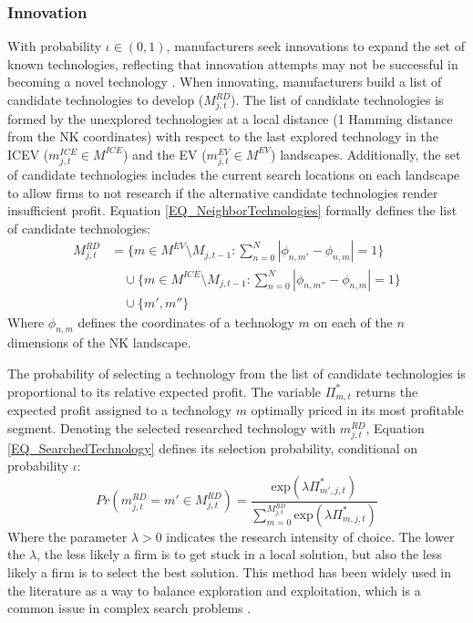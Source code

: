 \documentclass[12pt]{article}
\begin{document}
	\subsubsection{Innovation} \label{Supply:Innovation}
	With probability $\iota\in(0,1)$, manufacturers seek innovations to expand the set of known technologies, reflecting that innovation attempts may not be successful in becoming a novel technology \citep{nelson1977search, Dosi2010}. When innovating, manufacturers build a list of candidate technologies to develop ($M^{RD}_{j,t}$). The list of candidate technologies is formed by the unexplored technologies at a local distance (1 Hamming distance from the NK coordinates) with respect to the last explored technology in the ICEV ($m^{ICE}_{j,t}\in{M^{ICE}}$) and the EV ($m^{EV}_{j,t}\in{M^{EV}}$) landscapes. Additionally, the set of candidate technologies includes the current search locations on each landscape to allow firms to not research if the alternative candidate technologies render insufficient profit. Equation \ref{EQ_NeighborTechnologies} formally defines the list of candidate technologies: 
	\begin{equation}
		\begin{aligned}
			M^{RD}_{j,t} &= 
			\big\{ m \in M^{EV} \setminus M_{j,t-1} : \sum_{n=0}^{N} |\phi_{n,m'} - \phi_{n,m}| = 1 \big\} \\
			&\quad \cup \big\{ m \in M^{ICE} \setminus M_{j,t-1} : \sum_{n=0}^{N} |\phi_{n,m''} - \phi_{n,m}| = 1 \big\} \\
			&\quad \cup\{m',m''\}
		\end{aligned}
		\label{EQ_NeighborTechnologies}
	\end{equation}
	Where $\phi_{n,m}$ defines the coordinates of a technology $m$ on each of the $n$ dimensions of the NK landscape.
	
	The probability of selecting a technology from the list of candidate technologies is proportional to its relative expected profit. The variable $\Pi^*_{m,t}$ returns the expected profit assigned to a technology $m$ optimally priced in its most profitable segment. Denoting the selected researched technology with $m^{RD}_{j,t}$, Equation \ref{EQ_SearchedTechnology} defines its selection probability, conditional on probability $\iota$:
	\begin{equation}
		Pr(m^{RD}_{j,t}=m'\in{M^{RD}_{j,t}}) =\frac{ \text{exp}(\lambda \Pi^*_{m',j,t})}{\sum_{m=0}^{M^{RD}_{j,t}} \text{exp}(\lambda \Pi^*_{m,j,t})}
		\label{EQ_SearchedTechnology}
	\end{equation}
	Where the parameter $\lambda>0$ indicates the research intensity of choice. The lower the $\lambda$, the less likely a firm is to get stuck in a local solution, but also the less likely a firm is to select the best solution. This method has been widely used in the literature as a way to balance exploration and exploitation, which is a common issue in complex search problems \citep{Puranam2015}. 
	
\end{document}
